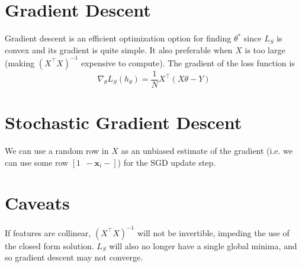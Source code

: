 \documentclass[12pt]{article}
\begin{document}
\section{Gradient Descent}

Gradient descent is an efficient optimization option for finding $\theta^*$ since $L_S$ is convex and its gradient is quite simple. It also preferable when $X$ is too large (making $(X^\top X)^{-1}$ expensive to compute). The gradient of the loss function is
\[ \nabla_\theta L_S(h_\theta) = \frac{1}{N}X^\top(X\theta - Y) \]

\section{Stochastic Gradient Descent}

We can use a random row in $X$ as an unbiased estimate of the gradient (i.e. we can use some row $[1 \;\, - \mathbf{x}_i -]$) for the SGD update step.

\section{Caveats}

If features are collinear, $(X^\top X)^{-1}$ will not be invertible, impeding the use of the closed form solution. $L_S$ will also no longer have a single global minima, and so gradient descent may not converge.
\end{document}
